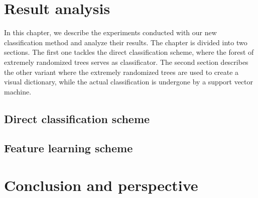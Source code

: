 \documentclass[a4paper]{report}
\begin{document}

		
\chapter{Result analysis}
In this chapter, we describe the experiments conducted with our new classification method and analyze their results. The chapter is divided into two sections. The first one tackles the direct classification scheme, where the forest of extremely randomized trees serves as classificator. The second section describes the other variant where the extremely randomized trees are used to create a visual dictionary, while the actual classification is undergone by a support vector machine.
	\section{Direct classification scheme}
	\section{Feature learning scheme}
\chapter{Conclusion and perspective}
 


  
\end{document}
